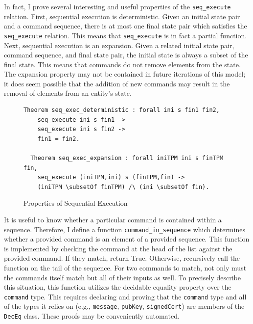 \documentclass[runningheads]{llncs}
\begin{document}
In fact, I prove several interesting and useful properties of the \verb|seq_execute| relation. First, sequential execution is deterministic. Given an initial state pair and a command sequence, there is at most one final state pair which satisfies the \verb|seq_execute| relation. This means that \verb|seq_execute| is in fact a partial function. Next, sequential execution is an expansion. Given a related initial state pair, command sequence, and final state pair, the initial state is always a subset of the final state. This means that commands do not remove elements from the state. The expansion property may not be contained in future iterations of this model; it does seem possible that the addition of new commands may result in the removal of elements from an entity's state.
\begin{figure}[h]
  \begin{lstlisting}[language=Coq]
  Theorem seq_exec_deterministic : forall ini s fin1 fin2,
    seq_execute ini s fin1 ->
    seq_execute ini s fin2 ->
    fin1 = fin2.
  
  Theorem seq_exec_expansion : forall iniTPM ini s finTPM fin,
    seq_execute (iniTPM,ini) s (finTPM,fin) ->
    (iniTPM \subsetOf finTPM) /\ (ini \subsetOf fin).
  \end{lstlisting}
  \caption{Properties of Sequential Execution}
  \end{figure}

It is useful to know whether a particular command is contained within a sequence. Therefore, I define a function \verb|command_in_sequence| which determines whether a provided command is an element of a provided sequence. This function is implemented by checking the command at the head of the list against the provided command. If they match, return True. Otherwise, recursively call the function on the tail of the sequence.
For two commands to match, not only must the commands itself match but all of their inputs as well. To precisely describe this situation, this function utilizes the decidable equality property over the \verb|command| type. This requires declaring and proving that the \verb|command| type and all of the types it relies on (e.g., \verb|message|, \verb|pubKey|, \verb|signedCert|) are members of the \verb|DecEq| class. These proofs may be conveniently automated.
%
%
%
\end{document}
